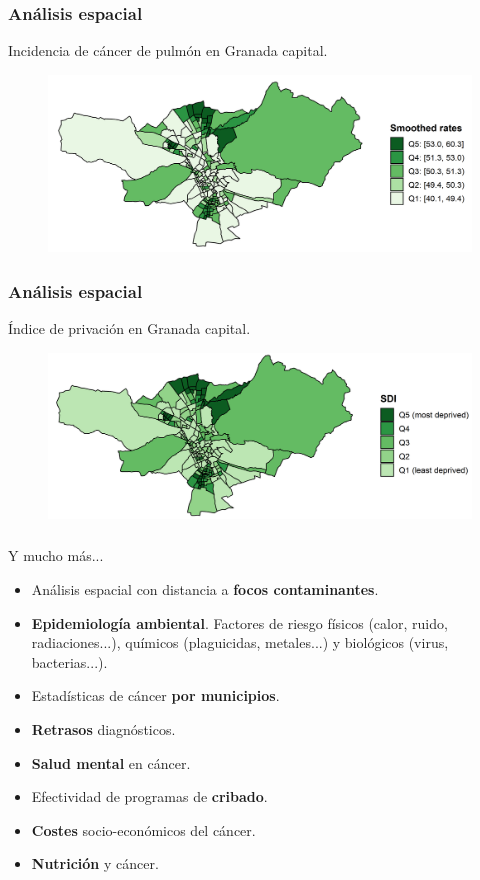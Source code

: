 \documentclass{beamer}
\begin{document}

\begin{frame}\frametitle{Análisis espacial}
	\centering Incidencia de cáncer de pulmón en Granada capital.
	\begin{figure}
		\centering
		\includegraphics[width=.9\textwidth]{images/03_lung_ebs_zoom.png}
	\end{figure}
\end{frame}


\begin{frame}\frametitle{Análisis espacial}
	\centering Índice de privación en Granada capital.
	\begin{figure}
		\centering
		\includegraphics[width=.9\textwidth]{images/maps_DI_zoom.png}
	\end{figure}
\end{frame}


\begin{frame}\frametitle{}
	\begin{block}{Y mucho más...}
		\begin{itemize}
			\item Análisis espacial con distancia a \textbf{focos contaminantes}.
			\item \textbf{Epidemiología ambiental}. Factores de riesgo físicos (calor, ruido, radiaciones...), químicos (plaguicidas, metales...) y biológicos (virus, bacterias...).
			\item Estadísticas de cáncer \textbf{por municipios}.
			\item \textbf{Retrasos} diagnósticos.
			\item \textbf{Salud mental} en cáncer.
			\item Efectividad de programas de \textbf{cribado}.
			\item \textbf{Costes} socio-económicos del cáncer.
			\item \textbf{Nutrición} y cáncer.
		\end{itemize}
	\end{block}
\end{frame}
\end{document}

